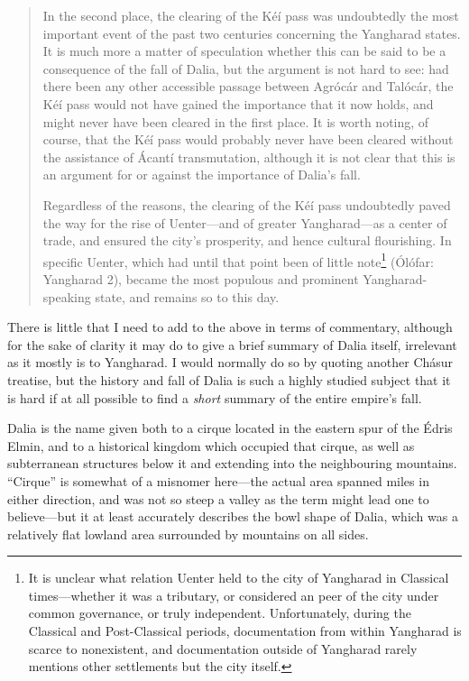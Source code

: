 \documentclass{article}
\begin{document}
\begin{quotation}
In the second place, the clearing of the Kéí pass was undoubtedly the most important event of the past two centuries concerning the Yangharad states. It is much more a matter of speculation whether this can be said to be a consequence of the fall of Dalia, but the argument is not hard to see: had there been any other accessible passage between Agrócár and Talócár, the Kéí pass would not have gained the importance that it now holds, and might never have been cleared in the first place. It is worth noting, of course, that the Kéí pass would probably never have been cleared without the assistance of Ácantí transmutation, although it is not clear that this is an argument for or against the importance of Dalia's fall.

Regardless of the reasons, the clearing of the Kéí pass undoubtedly paved the way for the rise of Uenter—and of greater Yangharad—as a center of trade, and ensured the city's prosperity, and hence cultural flourishing. In specific Uenter, which had until that point been of little note\footnote{It is unclear what relation Uenter held to the city of Yangharad in Classical times—whether it was a tributary, or considered an peer of the city under common governance, or truly independent. Unfortunately, during the Classical and Post-Classical periods, documentation from within Yangharad is scarce to nonexistent, and documentation outside of Yangharad rarely mentions other settlements but the city itself.} (Ólófar: Yangharad 2), became the most populous and prominent Yangharad-speaking state, and remains so to this day.

\end{quotation}

\color{DarkGreen}

There is little that I need to add to the above in terms of commentary, although for the sake of clarity it may do to give a brief summary of Dalia itself, irrelevant as it mostly is to Yangharad. I would normally do so by quoting another Chásur treatise, but the history and fall of Dalia is such a highly studied subject that it is hard if at all possible to find a \emph{short} summary of the entire empire's fall.

Dalia is the name given both to a cirque located in the eastern spur of the Édris Elmin, and to a historical kingdom which occupied that cirque, as well as subterranean structures below it and extending into the neighbouring mountains. ``Cirque'' is somewhat of a misnomer here—the actual area spanned miles in either direction, and was not so steep a valley as the term might lead one to believe—but it at least accurately describes the bowl shape of Dalia, which was a relatively flat lowland area surrounded by mountains on all sides.
\end{document}
